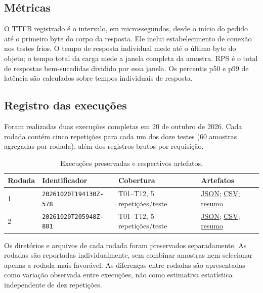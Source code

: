 \documentclass[12pt,a4paper]{article}
\begin{document}
\subsection{Métricas}

O TTFB registrado é o intervalo, em microssegundos, desde o início do pedido até o primeiro
byte do corpo da resposta. Ele inclui estabelecimento de conexão nos testes frios. O tempo
de resposta individual mede até o último byte do objeto; o tempo total da carga mede a janela
completa da amostra. RPS é o total de respostas bem-sucedidas dividido por essa janela.
Os percentis p50 e p99 de latência são calculados sobre tempos individuais de resposta.

\subsection{Registro das execuções}

Foram realizadas duas execuções completas em 20 de outubro de 2026. Cada rodada contém
cinco repetições para cada um dos doze testes (60 amostras agregadas por rodada), além dos
registros brutos por requisição.

\begin{table}[H]
\centering
\small
\caption{Execuções preservadas e respectivos artefatos.}
\begin{tabularx}{\textwidth}{@{}l l l X@{}}
\toprule
Rodada & Identificador & Cobertura & Artefatos\\
\midrule
1 & \texttt{20261020T194130Z-578} & T01--T12, 5 repetições/teste &
\href{results/20261020T194130Z-578/results.json}{JSON};
\href{results/20261020T194130Z-578/results.csv}{CSV};
\href{results/20261020T194130Z-578/plots/summary.md}{resumo}\\
2 & \texttt{20261020T205948Z-881} & T01--T12, 5 repetições/teste &
\href{results/20261020T205948Z-881/results.json}{JSON};
\href{results/20261020T205948Z-881/results.csv}{CSV};
\href{results/20261020T205948Z-881/plots/summary.md}{resumo}\\
\bottomrule
\end{tabularx}
\end{table}

Os diretórios e arquivos de cada rodada foram preservados separadamente. As rodadas são
reportadas individualmente, sem combinar amostras nem selecionar apenas a rodada mais
favorável. As diferenças entre rodadas são apresentadas como variação observada entre
execuções, não como estimativa estatística independente de dez repetições.
\end{document}
